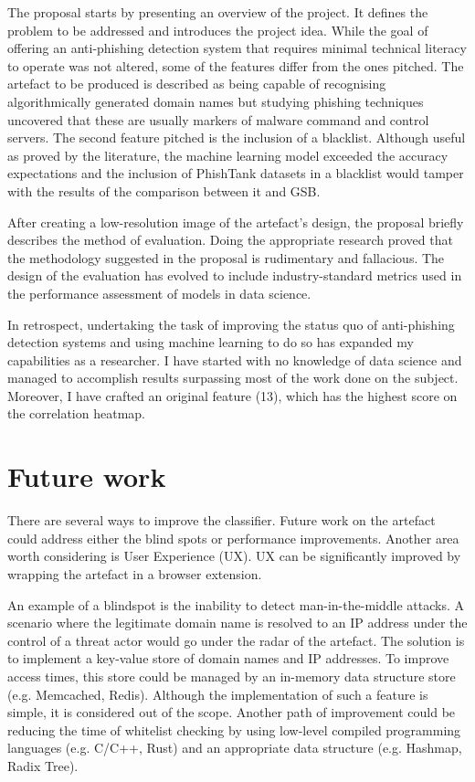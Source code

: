 The proposal starts by presenting an overview of the project. It defines the problem to be addressed and introduces the project idea. While the goal of offering an anti-phishing detection system that requires minimal technical literacy to operate was not altered, some of the features differ from the ones pitched. The artefact to be produced is described as being capable of recognising algorithmically generated domain names but studying phishing techniques uncovered that these are usually markers of malware command and control servers. The second feature pitched is the inclusion of a blacklist. Although useful as proved by the literature, the machine learning model exceeded the accuracy expectations and the inclusion of PhishTank datasets in a blacklist would tamper with the results of the comparison between it and GSB.

After creating a low-resolution image of the artefact's design, the proposal briefly describes the method of evaluation. Doing the appropriate research proved that the methodology suggested in the proposal is rudimentary and fallacious. The design of the evaluation has evolved to include industry-standard metrics used in the performance assessment of models in data science.

In retrospect, undertaking the task of improving the status quo of anti-phishing detection systems and using machine learning to do so has expanded my capabilities as a researcher. I have started with no knowledge of data science and managed to accomplish results surpassing most of the work done on the subject. Moreover, I have crafted an original feature (13), which has the highest score on the correlation heatmap.

\section{Future work}
There are several ways to improve the classifier. Future work on the artefact could address either the blind spots or performance improvements. Another area worth considering is User Experience (UX). UX can be significantly improved by wrapping the artefact in a browser extension.

An example of a blindspot is the inability to detect man-in-the-middle attacks. A scenario where the legitimate domain name is resolved to an IP address under the control of a threat actor would go under the radar of the artefact. The solution is to implement a key-value store of domain names and IP addresses. To improve access times, this store could be managed by an in-memory data structure store (e.g. Memcached, Redis). Although the implementation of such a feature is simple, it is considered out of the scope.
Another path of improvement could be reducing the time of whitelist checking by using low-level compiled programming languages (e.g. C/C++, Rust) and an appropriate data structure (e.g. Hashmap, Radix Tree).


